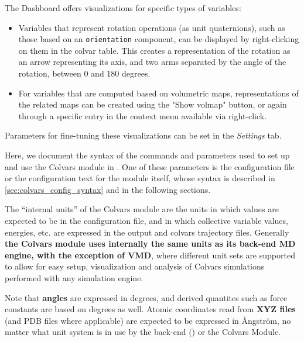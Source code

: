 {The Dashboard offers visualizations for specific types of variables:
\begin{itemize}
  \item Variables that represent rotation operations (as unit quaternions), such as those based on an \texttt{orientation} component, can be displayed by right-clicking on them in the colvar table.
  This creates a representation of the rotation as an arrow representing its axis, and two arms separated by the angle of the rotation, between 0 and 180 degrees.
  \item For variables that are computed based on volumetric maps, representations of the related maps can be created using the "Show volmap" button, or again through a specific entry in the context menu available via right-click.
\end{itemize}
Parameters for fine-tuning these visualizations can be set in the \textit{Settings} tab.


} %


Here, we document the syntax of the commands and parameters used to set up and use the Colvars module in \MDENGINE{}.
One of these parameters is the configuration file or the configuration text for the module itself, whose syntax is described in \ref{sec:colvars_config_syntax} and in the following sections.


The ``internal units'' of the Colvars module are the units in which values are expected to be in the configuration file, and in which collective variable values, energies, etc. are expressed in the output and colvars trajectory files.
Generally \textbf{the Colvars module uses internally the same units as its back-end MD engine, with the exception of VMD}, where different unit sets are supported to allow for easy setup, visualization and analysis of Colvars simulations performed with any simulation engine.

Note that \textbf{angles} are expressed in degrees, and derived quantites such as force constants are based on degrees as well.
Atomic coordinates read from \textbf{XYZ files} (and PDB files where applicable) are expected to be expressed in \AA{}ngstr\"om, no matter what unit system is in use by the back-end (\MDENGINE) or the Colvars Module.

